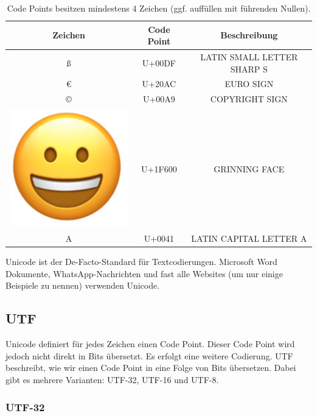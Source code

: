 \begin{table}[htb]
\centering
\begin{tabular}{|c|c|c|}
\hline
Zeichen & Code Point                & Beschreibung               \\ \hline
ß       & U+00DF     & LATIN SMALL LETTER SHARP S \\ \hline
€       & U+20AC     &  EURO SIGN                  \\ \hline
©       & U+00A9     &  COPYRIGHT SIGN             \\ \hline
\rule{0pt}{15pt} \includegraphics[scale=0.1]{emoji_grinning_face} & U+1F600    &   GRINNING FACE       \\ \hline
A & U+0041    & LATIN CAPITAL LETTER A             \\ \hline
\end{tabular}
\caption{Code Points besitzen mindestens \num{4} Zeichen (ggf. auffüllen mit führenden Nullen).}
\label{table-unicode}
\end{table}

Unicode ist der De-Facto-Standard für Textcodierungen. Microsoft Word Dokumente, WhatsApp-Nachrichten und fast alle Websites (um nur einige Beispiele zu nennen) verwenden Unicode.

\subsection{\acs{UTF}}

Unicode definiert für jedes Zeichen einen Code Point. Dieser Code Point wird jedoch nicht direkt in Bits übersetzt. Es erfolgt eine weitere Codierung. \ac{UTF} beschreibt, wie wir einen Code Point in eine Folge von Bits übersetzen. Dabei gibt es mehrere Varianten: UTF-32, UTF-16 und UTF-8.

\subsubsection{UTF-32}

